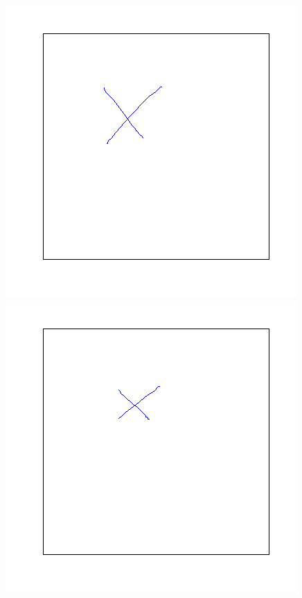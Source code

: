 \documentclass[a4paper, 10pt]{article}
\begin{document}
\begin{figure}[ht]
\begin{minipage}[b]{0.45\linewidth}
\centering
\includegraphics[width=\textwidth]{figs/x-1}
\caption{}
\label{fig:figure1}
\end{minipage}
\hspace{0.5cm}
\begin{minipage}[b]{0.45\linewidth}
\centering
\includegraphics[width=\textwidth]{figs/x-2}
\caption{}
\label{fig:figure2}
\end{minipage}
\end{figure}
\end{document}
